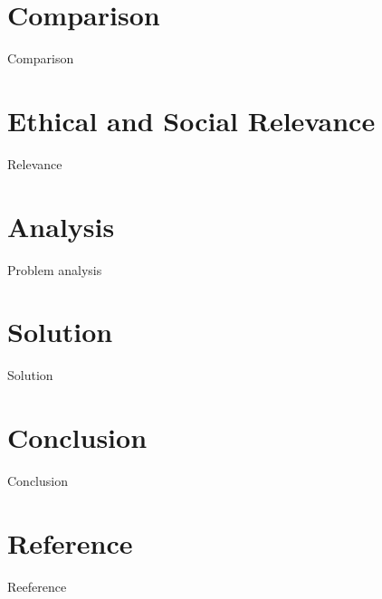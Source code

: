 \documentclass{beamer}
\begin{document}
	\section{Comparison}
	\begin{frame}{Comparison}
	\end{frame}
	\section{Ethical and Social Relevance}
	\begin{frame}{Relevance}
	\end{frame}
	\section{Analysis}
	\begin{frame}{Problem analysis}
	\end{frame}
	\section{Solution}
	\begin{frame}{Solution}
	\end{frame}
	\section{Conclusion}
	\begin{frame}{Conclusion}
	\end{frame}
	\section{Reference}
	\begin{frame}{Reeference}
	\end{frame}
\end{document}
